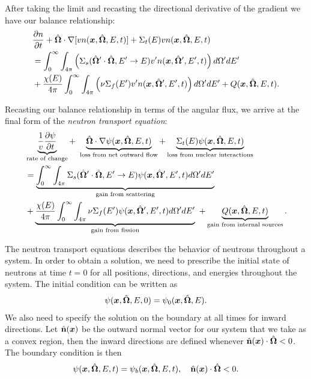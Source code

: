 After taking the limit and recasting the directional derivative of the gradient we have our balance relationship:
\begin{align}
  &\frac{ \partial {n} }{ \partial {t} } + \hat{\mathbf{\Omega}} \cdot \nabla [ v n(\bm{x},\hat{\mathbf{\Omega}},E,t) ] + \Sigma_t(E) v n( \bm{x} , \hat{\mathbf{\Omega}}, E, t )  \nonumber \\*
  &= \int_0^\infty \int_{4\pi} \left(  \Sigma_s(\hat{\mathbf{\Omega}}' \cdot \hat{\mathbf{\Omega}}, E' \rightarrow E ) v' n( \bm{x} , \hat{\mathbf{\Omega}}', E', t ) \right) d\Omega' dE' \nonumber \\*
  &+ \frac{\chi(E)}{4\pi} \int_0^\infty \int_{4\pi} \left( \nu \Sigma_f(E') v' n( \bm{x} , \hat{\mathbf{\Omega}}', E', t ) \right) d\Omega' dE' 
  + Q( \bm{x}, \hat{\mathbf{\Omega}}, E, t ) .
\end{align}

Recasting our balance relationship in terms of the angular flux, we arrive at the final form of the \emph{neutron transport equation}:
\begin{align} \label{Eq:neutronics_neutronTransportEquation_timeDependent_labeled}
  &\underbrace{\frac{1}{v} \dho{\psi}{t}}_\text{rate of change} + \ \underbrace{\dir \cdot \nabla \psi(\pos,\dir,E,t)}_\text{loss from net outward flow} + \underbrace{\Sigma_t(E) \psi( \pos , \dir, E, t )}_\text{loss from nuclear interactions}  \nonumber \\*
  &= \underbrace{\int_0^\infty \int_{4\pi}  \Sigma_s(\dir' \cdot \dir, E' \rightarrow E ) \psi( \pos , \dir', E', t ) d\Omega' dE'}_\text{gain from scattering} \nonumber \\*
  &+ \underbrace{\frac{\chi(E)}{4\pi} \int_0^\infty \int_{4\pi} \nu \Sigma_f(E') \psi( \pos , \dir', E', t ) d\Omega' dE' }_\text{gain from fission}
  \ + \underbrace{Q( \pos, \dir, E, t )}_\text{gain from internal sources} .
\end{align}

The neutron transport equations describes the behavior of neutrons throughout a system. In order to obtain a solution, we need to prescribe the initial state of neutrons at time $t = 0$ for all positions, directions, and energies throughout the system. The initial condition can be written as
\begin{align}
  \psi(\bm{x},\hat{\mathbf{\Omega}},E,0) = \psi_0(\bm{x},\hat{\mathbf{\Omega}},E) .
\end{align}
We also need to specify the solution on the boundary at all times for inward directions. Let $\hat{\mathbf{n}}(\bm{x})$ be the outward normal vector for our system that we take as a convex region, then the inward directions are defined whenever $\hat{\mathbf{n}}(\bm{x}) \cdot \hat{\mathbf{\Omega}} < 0$. The boundary condition is then
\begin{align}
  \psi(\bm{x},\hat{\mathbf{\Omega}},E,t) = \psi_b(\bm{x},\hat{\mathbf{\Omega}},E,t), \quad \hat{\mathbf{n}}(\bm{x}) \cdot \hat{\mathbf{\Omega}} < 0.
\end{align}

